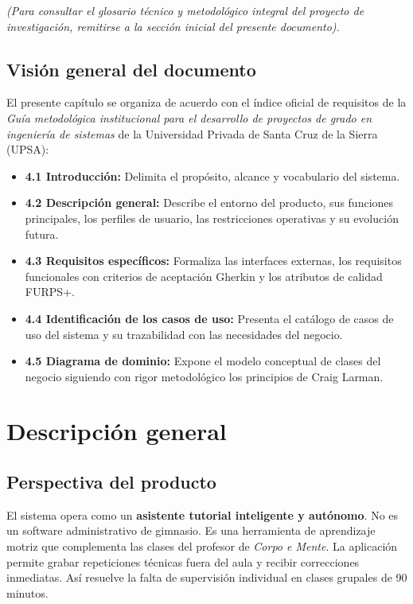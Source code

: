 \documentclass[12pt,letterpaper]{article}
\begin{document}
\textit{(Para consultar el glosario técnico y metodológico integral del proyecto de investigación, remitirse a la sección inicial del presente documento).}

\subsection{Visión general del documento}
El presente capítulo se organiza de acuerdo con el índice oficial de requisitos de la \textit{Guía metodológica institucional para el desarrollo de proyectos de grado en ingeniería de sistemas} de la Universidad Privada de Santa Cruz de la Sierra (UPSA):
\begin{itemize}
    \item \textbf{4.1 Introducción:} Delimita el propósito, alcance y vocabulario del sistema.
    \item \textbf{4.2 Descripción general:} Describe el entorno del producto, sus funciones principales, los perfiles de usuario, las restricciones operativas y su evolución futura.
    \item \textbf{4.3 Requisitos específicos:} Formaliza las interfaces externas, los requisitos funcionales con criterios de aceptación Gherkin y los atributos de calidad FURPS+.
    \item \textbf{4.4 Identificación de los casos de uso:} Presenta el catálogo de casos de uso del sistema y su trazabilidad con las necesidades del negocio.
    \item \textbf{4.5 Diagrama de dominio:} Expone el modelo conceptual de clases del negocio siguiendo con rigor metodológico los principios de Craig Larman.
\end{itemize}

\section{Descripción general}

\subsection{Perspectiva del producto}
El sistema opera como un \textbf{asistente tutorial inteligente y autónomo}. No es un software administrativo de gimnasio. Es una herramienta de aprendizaje motriz que complementa las clases del profesor de \textit{Corpo e Mente}. La aplicación permite grabar repeticiones técnicas fuera del aula y recibir correcciones inmediatas. Así resuelve la falta de supervisión individual en clases grupales de 90 minutos.
\end{document}
